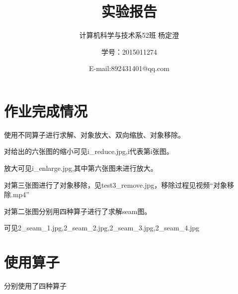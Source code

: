 \documentclass{ctexart}
\begin{document}
\title{实验报告}
\author{计算机科学与技术系52班 杨定澄 \and 学号：2015011274 \and E-mail:892431401@qq.com}
\date{}
\maketitle
\section{作业完成情况}
使用不同算子进行求解、对象放大、双向缩放、对象移除。

对给出的六张图的缩小可见i\_reduce.jpg,i代表第i张图。

放大可见i\_enlarge.jpg,其中第六张图未进行放大。

对第三张图进行了对象移除，见test3\_remove.jpg，移除过程见视频“对象移除.mp4”

对第二张图分别用四种算子进行了求解seam图。

可见2\_seam\_1.jpg,2\_seam\_2.jpg,2\_seam\_3.jpg,2\_seam\_4.jpg
\section{使用算子}
分别使用了四种算子
\end{document}
